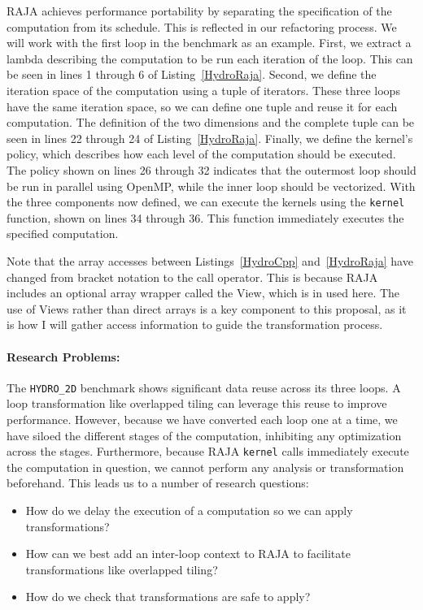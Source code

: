 \documentclass{article}
\begin{document}
RAJA achieves performance portability by separating the specification of the computation from its schedule.
This is reflected in our refactoring process.
We will work with the first loop in the benchmark as an example.
First, we extract a lambda describing the computation to be run each iteration of the loop.
This can be seen in lines 1 through 6 of Listing~\ref{HydroRaja}.
Second, we define the iteration space of the computation using a tuple of iterators. 
These three loops have the same iteration space, so we can define one tuple and reuse it for each computation.
The definition of the two dimensions and the complete tuple can be seen in lines 22 through 24 of Listing~\ref{HydroRaja}.
Finally, we define the kernel's policy, which describes how each level of the computation should be executed. 
The policy shown on lines 26 through 32 indicates that the outermost loop should be run in parallel using OpenMP, while the inner loop should be vectorized.
With the three components now defined, we can execute the kernels using the \verb.kernel. function, shown on lines 34 through 36.
This function immediately executes the specified computation.

Note that the array accesses between Listings~\ref{HydroCpp} and~\ref{HydroRaja} have changed from bracket notation to the call operator. 
This is because RAJA includes an optional array wrapper called the View, which is in used here.
The use of Views rather than direct arrays is a key component to this proposal, as it is how I will gather access information to guide the transformation process.


\paragraph{Research Problems:}
The \verb.HYDRO_2D. benchmark shows significant data reuse across its three loops.
A loop transformation like overlapped tiling can leverage this reuse to improve performance.
However, because we have converted each loop one at a time, we have siloed the different stages of the computation, inhibiting any optimization across the stages.
Furthermore, because RAJA \verb.kernel. calls immediately execute the computation in question, we cannot perform any analysis or transformation beforehand.
This leads us to a number of research questions:
\begin{itemize}
\item How do we delay the execution of a computation so we can apply transformations?
\item How can we best add an inter-loop context to RAJA to facilitate transformations like overlapped tiling?
\item How do we check that transformations are safe to apply?
\end{itemize}
\end{document}
